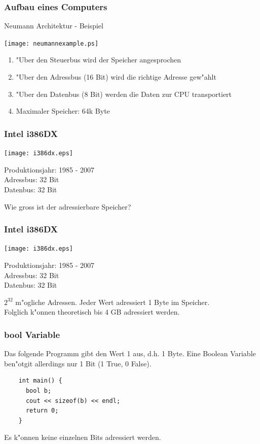\documentclass{beamer}
\begin{document}
\frame
{
	\frametitle{Aufbau eines Computers}
	Neumann Architektur - Beispiel\\
	\vspace{3mm}
	\begin{multicols}{2}
	\texttt{[image: neumannexample.ps]}
	{\small
	\begin{enumerate}
	\item "Uber den Steuerbus wird der Speicher angesprochen
	\item "Uber den Adressbus (16 Bit) wird die richtige Adresse gew"ahlt
	\item "Uber den Datenbus (8 Bit) werden die Daten zur CPU transportiert
	\item Maximaler Speicher: 64k Byte
	\end{enumerate}
	}
	\end{multicols}
}

\frame
{
	\frametitle{Intel i386DX}
	\texttt{[image: i386dx.eps]}

	\vspace{3mm}

	{\small
	Produktionsjahr: 1985 - 2007\\
	Adressbus: 32 Bit\\
	Datenbus: 32 Bit

	\vspace{3mm}

	Wie gross ist der adressierbare Speicher?
	}
}

\frame
{
	\frametitle{Intel i386DX}
	\texttt{[image: i386dx.eps]}

	\vspace{3mm}

	{\small
	Produktionsjahr: 1985 - 2007\\
	Adressbus: 32 Bit\\
	Datenbus: 32 Bit

	\vspace{3mm}

	$2^{32}$ m"ogliche Adressen. Jeder Wert adressiert 1 Byte im Speicher.\\
	Folglich k"onnen theoretisch bis 4 GB adressiert werden.
	}
}

\begin{frame}[fragile]

	\frametitle{bool Variable}
	Das folgende Programm gibt den Wert 1 aus, d.h. 1 Byte. Eine
	Boolean Variable ben"otgit allerdings nur 1 Bit (1 True, 0 False).

	\begin{lstlisting}
	int main() {
	  bool b;
	  cout << sizeof(b) << endl;
	  return 0;
	}
	\end{lstlisting}

	Es k"onnen keine einzelnen Bits adressiert werden.
\end{frame}
\end{document}
